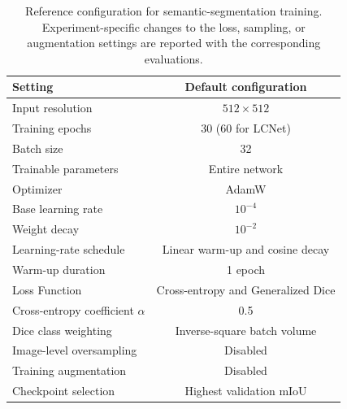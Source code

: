 \begin{table}[ht!]
    \centering
    \begin{tabular}{@{}l c@{}}
        \toprule
        \textbf{Setting}                     & \textbf{Default configuration}     \\
        \midrule
        \midrule
        Input resolution                     & \(512 \times 512\)                 \\
        Training epochs                      & 30 (60 for LCNet)                  \\
        Batch size                           & 32                                 \\
        Trainable parameters                 & Entire network                     \\
        Optimizer                            & AdamW                              \\
        Base learning rate                   & \(10^{-4}\)                        \\
        Weight decay                         & \(10^{-2}\)                        \\
        Learning-rate schedule               & Linear warm-up and cosine decay    \\
        Warm-up duration                     & 1 epoch                            \\
        Loss Function                        & Cross-entropy and Generalized Dice \\
        Cross-entropy coefficient \(\alpha\) & 0.5                                \\
        Dice class weighting                 & Inverse-square batch volume        \\
        Image-level oversampling             & Disabled                           \\
        Training augmentation                & Disabled                           \\
        Checkpoint selection                 & Highest validation mIoU            \\
        \bottomrule
    \end{tabular}
    \vspace{5mm}
    \caption{Reference configuration for semantic-segmentation training.
        Experiment-specific changes to the loss, sampling, or augmentation
        settings are reported with the corresponding evaluations.}
    \label{tab}
\end{table}

